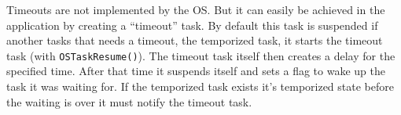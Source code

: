 Timeouts are not implemented by the OS.
But it can easily be achieved in the application by creating a ``timeout'' task.
By default this task is suspended if another tasks that needs a timeout, the temporized task, it starts the timeout task (with \lstinline{OSTaskResume()}).
The timeout task itself then creates a delay for the specified time. After that time it suspends itself and sets a flag to wake up the task it was waiting for.
If the temporized task exists it's temporized state before the waiting is over it must notify the timeout task.

